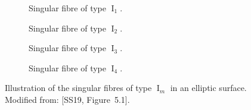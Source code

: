 \documentclass{article}
\DeclareMathOperator{\I}{I}
\begin{document}
\begin{figure}[!ht]
\begin{center}
\begin{subfigure}{0.45\textwidth}
\centering
{}

\caption{Singular fibre of type $\I_1$.}
\end{subfigure}
\begin{subfigure}{0.45\textwidth}
\centering
{}

\caption{Singular fibre of type $\I_2$.}
\end{subfigure}
\vspace{20mm}

\begin{subfigure}{0.45\textwidth}
\centering
{}

\caption{Singular fibre of type $\I_3$.}
\end{subfigure}
\begin{subfigure}{0.45\textwidth}
\centering
{}

\caption{Singular fibre of type $\I_4$.}
\end{subfigure}
\caption{Illustration of the singular fibres of type $\I_m$ in an elliptic surface. Modified from: [SS19, Figure~5.1].}
\end{center}
\end{figure}
\end{document}
